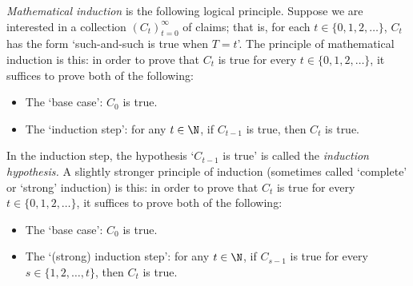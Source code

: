 \documentclass[11pt,letterpaper,reqno,oneside]{book}
\begin{document}
\begin{appendices}
\emph{Mathematical induction} is the following logical principle. Suppose we are interested in a collection $(C_t)_{t=0}^\infty$ of claims; that is, for each $t \in \{0,1,2,\dots\}$, $C_t$ has the form `such-and-such is true when $T=t$'. The principle of mathematical induction is this: in order to prove that $C_t$ is true for every $t \in \{0,1,2,\dots\}$, it suffices to prove both of the following:

\begin{itemize}

	\item The `base case': $C_0$ is true.

	\item The `induction step': for any $t \in \N$, if $C_{t-1}$ is true, then $C_t$ is true.

\end{itemize}
%
In the induction step, the hypothesis `$C_{t-1}$ is true' is called the \emph{induction hypothesis.}
A slightly stronger principle of induction (sometimes called `complete' or `strong' induction) is this: in order to prove that $C_t$ is true for every $t \in \{0,1,2,\dots\}$, it suffices to prove both of the following:

\begin{itemize}

	\item The `base case': $C_0$ is true.

	\item The `(strong) induction step': for any $t \in \N$, if $C_{s-1}$ is true for every $s \in \{1,2,\dots,t\}$, then $C_t$ is true.

\end{itemize}



\end{appendices}








\printbibliography[heading=bibintoc]



\end{document}
